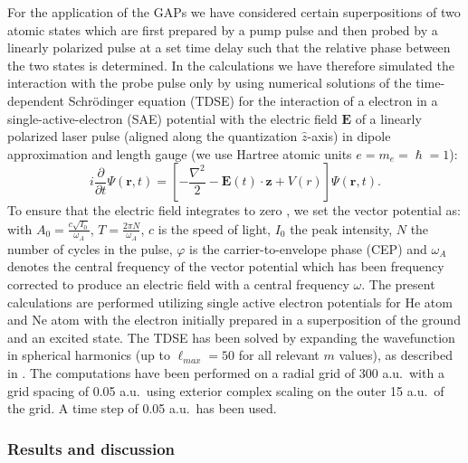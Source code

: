 For the application of the GAPs we have considered certain superpositions of two atomic states which are first prepared by a pump pulse and then probed by a linearly polarized pulse at a set time delay such that the relative phase between the two states is determined. In the calculations we have therefore simulated the interaction with the probe pulse only by
using numerical solutions of the time-dependent Schr\"odinger equation (TDSE) for the interaction of a electron in a single-active-electron (SAE) potential with the electric field $\mathbf{E}$ of a linearly polarized laser pulse (aligned along the quantization ${\hat z}$-axis) in dipole approximation and length gauge (we use Hartree atomic units $e = m_e = \hslash =1$): 
\begin{equation}
i\frac{\partial}{\partial t}\Psi(\mathbf{r},t) = \left[-\frac{\nabla^2}{2} - \mathbf{E}(t) \cdot \mathbf{z} + V(r)\right]\Psi(\mathbf{r},t).
\end{equation}
To ensure that the electric field integrates to zero \cite{chelkowski2002}, we set the vector potential as:
with $A_0 = \frac{c\sqrt{I_0}}{\omega_A}$, $T = \frac{2\pi N}{\omega_A}$, $c$ is the speed of light, $I_0$ the peak intensity, $N$ the number of cycles in the pulse, $\varphi$ is the carrier-to-envelope phase (CEP) and $\omega_A$ denotes the central frequency of the vector potential which has been frequency corrected \cite{venzke2018_Central} to produce an electric field with a central frequency $\omega$.  The present calculations are performed utilizing single active electron potentials for He atom and Ne atom \cite{reiff2020} with the electron initially prepared in a superposition of the ground and an excited state. The TDSE has been solved by expanding the wavefunction in spherical harmonics (up to $\ell_{max} = 50$ for all relevant $m$ values), as described in \cite{venzke2020_ionization}. The computations have been performed on a radial grid of 300 a.u.\ with a grid spacing of 0.05 a.u.\, using exterior complex scaling on the outer 15 a.u.\ of the grid. A time step of 0.05 a.u.\ has been used.

\subsubsection{Results and discussion}

